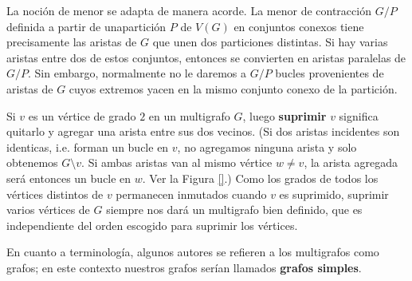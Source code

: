 \documentclass[../main.tex]{subfiles}
\begin{document}
  La noción de menor se adapta de manera acorde. La menor de contracción $G/P$ definida a partir de unapartición $P$
  de $V(G)$ en conjuntos conexos tiene precisamente las aristas de $G$ que unen dos particiones distintas. Si hay
  varias aristas entre dos de estos conjuntos, entonces se convierten en aristas paralelas de $G/P$. Sin embargo,
  normalmente no le daremos a $G/P$ bucles provenientes de aristas de $G$ cuyos extremos yacen en la mismo conjunto
  conexo de la partición.

  Si $v$ es un vértice de grado $2$ en un multigrafo $G$, luego \textbf{suprimir} $v$ significa quitarlo y agregar
  una arista entre sus dos vecinos. (Si dos aristas incidentes son identicas, i.e. forman un bucle en $v$, no
  agregamos ninguna arista y solo obtenemos $G \setminus v$. Si ambas aristas van al mismo vértice $w \neq v$, la
  arista agregada será entonces un bucle en $w$. Ver la Figura \ref{}.) Como los grados de todos los vértices
  distintos de $v$ permanecen inmutados cuando $v$ es suprimido, suprimir varios vértices de $G$ siempre nos dará un
  multigrafo bien definido, que es independiente del orden escogido para suprimir los vértices.

  En cuanto a terminología, algunos autores se refieren a los multigrafos como grafos; en este contexto nuestros
  grafos serían llamados \textbf{grafos simples}.
\end{document}
